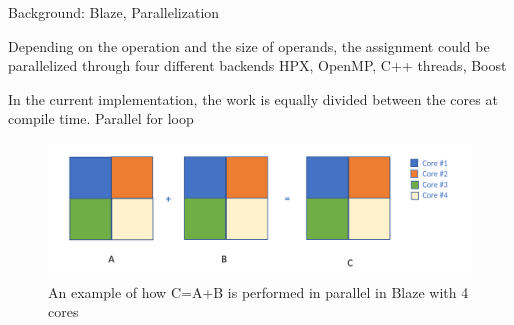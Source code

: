 \documentclass[10pt]{beamer}
\begin{document}
\begin{frame}{Background: Blaze, Parallelization}
	\begin{outline}
		Depending on the operation and the size of operands, the assignment could be parallelized through four different backends
		\1HPX, OpenMP, C++ threads, Boost
		

		\0In the current implementation, the work is equally divided between the cores at compile time. 
		\1Parallel for loop
		\begin{figure}
			\centering
			\includegraphics[width=0.72\linewidth]{images/old_backend.png}
			\caption{An example of how C=A+B is performed in parallel in Blaze with 4 cores}	
		\end{figure}	

	\end{outline}
\end{frame}

\end{document}

